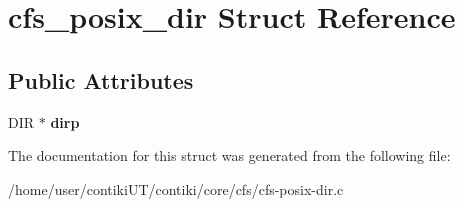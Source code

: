 \hypertarget{structcfs__posix__dir}{}\section{cfs\+\_\+posix\+\_\+dir Struct Reference}
\label{structcfs__posix__dir}
\subsection*{Public Attributes}
\begin{DoxyCompactItemize}
\item 
\hypertarget{structcfs__posix__dir_a59e4ed7b8533abdac0c9b8d853d1c466}{}D\+I\+R $\ast$ {\bfseries dirp}\label{structcfs__posix__dir_a59e4ed7b8533abdac0c9b8d853d1c466}

\end{DoxyCompactItemize}


The documentation for this struct was generated from the following file\+:\begin{DoxyCompactItemize}
\item 
/home/user/contiki\+U\+T/contiki/core/cfs/cfs-\/posix-\/dir.\+c\end{DoxyCompactItemize}
